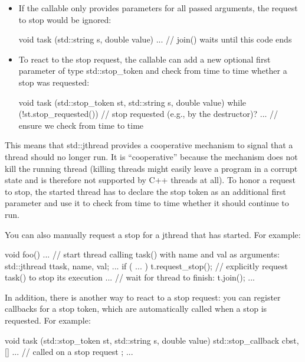 \begin{itemize}
\item 
If the callable only provides parameters for all passed arguments, the request to stop would be ignored:

\begin{cpp}
void task (std::string s, double value)
{
	... // join() waits until this code ends
}
\end{cpp}

\item 
To react to the stop request, the callable can add a new optional first parameter of type std::stop\_token and check from time to time whether a stop was requested:

\begin{cpp}
void task (std::stop_token st,
std::string s, double value)
{
	while (!st.stop_requested()) { // stop requested (e.g., by the destructor)?
		... // ensure we check from time to time
	}
}
\end{cpp}
\end{itemize}

This means that std::jthread provides a cooperative mechanism to signal that a thread should no longer run. It is “cooperative” because the mechanism does not kill the running thread (killing threads might easily leave a program in a corrupt state and is therefore not supported by C++ threads at all). To honor a request to stop, the started thread has to declare the stop token as an additional first parameter and use it to check from time to time whether it should continue to run.

You can also manually request a stop for a jthread that has started. For example:

\begin{cpp}
void foo()
{
	...
	// start thread calling task() with name and val as arguments:
	std::jthread t{task, name, val};
	...
	if ( ... ) {
		t.request_stop(); // explicitly request task() to stop its execution
	}
	...
	// wait for thread to finish:
	t.join();
	...
}
\end{cpp}

In addition, there is another way to react to a stop request: you can register callbacks for a stop token, which are automatically called when a stop is requested. For example:

\begin{cpp}
void task (std::stop_token st,
std::string s, double value)
{
	std::stop_callback cb{st, [] {
							   ... // called on a stop request
							  }};
	...
}
\end{cpp}


